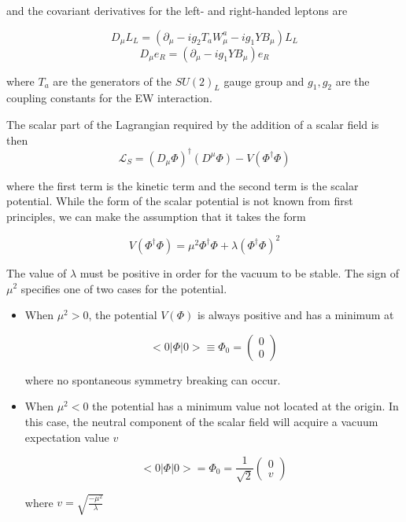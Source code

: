 	and the covariant derivatives for the left- and right-handed leptons are

	\begin{equation}
	D_{\mu}L_{L} = (\partial_{\mu}- ig_{2}T_{a}W_{\mu}^{a}-ig_{1}YB_{\mu})L_{L}
	\end{equation}
	\begin{equation}
	D_{\mu}e_{R} = (\partial_{\mu}- ig_{1}YB_{\mu})e_{R}
	\end{equation}

	where $T_{a}$ are the generators of the $SU(2)_{L}$ gauge group and $g_{1},g_{2}$ are the coupling constants for the EW interaction.

	The scalar part of the Lagrangian required by the addition of a scalar field is then
		\begin{equation}
			\mathcal{L}_{S} = (D_{\mu}\Phi)^{\dagger}(D^{\mu}\Phi) - V(\Phi^{\dagger}\Phi)
		\end{equation}

	where the first term is the kinetic term and the second term is the scalar potential. While the form of the scalar potential is not known from first principles, we can make the assumption that it takes the form 

		\begin{equation}
		V(\Phi^{\dagger}\Phi) = \mu^{2}\Phi^{\dagger}\Phi+\lambda(\Phi^{\dagger}\Phi)^{2}
		\end{equation}

	The value of $\lambda$ must be positive in order for the vacuum to be stable. The sign of $\mu^{2}$ specifies one of two cases for the potential.

	\begin{itemize}
			\item When $\mu^{2}>0$, the potential $V(\Phi)$ is always positive and has a minimum at

			\begin{equation}
			<0|\Phi|0>\equiv\Phi_{0} = \begin{pmatrix} 0 \\ 0 \end{pmatrix}
			\end{equation}

			where no spontaneous symmetry breaking can occur. 

			\item When $\mu^{2}<0$ the potential has a minimum value not located at the origin. In this case, the neutral component of the scalar field will acquire a vacuum expectation value $v$

			\begin{equation}
			<0|\Phi|0> = \Phi_{0} = \frac{1}{\sqrt{2}}\begin{pmatrix} 0 \\ v \end{pmatrix}
			\end{equation}

			where $v=\sqrt{\frac{-\mu^{2}}{\lambda}}$
	\end{itemize}

